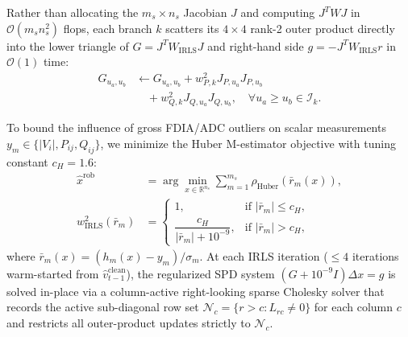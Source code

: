 \documentclass[journal,twoside]{IEEEtran}
\begin{document}
Rather than allocating the $m_s \times n_s$ Jacobian $J$ and computing $J^T W J$ in $\mathcal{O}(m_s n_s^2)$ flops, each branch $k$ scatters its $4 \times 4$ rank-2 outer product directly into the lower triangle of $G = J^T W_{\mathrm{IRLS}} J$ and right-hand side $g = -J^T W_{\mathrm{IRLS}} r$ in $\mathcal{O}(1)$ time:
\begin{equation}
\begin{aligned}
G_{u_a, u_b} &\gets G_{u_a, u_b} + w_{P,k}^2 J_{P,u_a} J_{P,u_b} \\
&\quad + w_{Q,k}^2 J_{Q,u_a} J_{Q,u_b}, \quad \forall u_a \ge u_b \in \mathcal{I}_k.
\end{aligned}
\label{eq:rank2_scatter}
\end{equation}

To bound the influence of gross FDIA/ADC outliers on scalar measurements $y_m \in \{|V_i|, P_{ij}, Q_{ij}\}$, we minimize the Huber M-estimator objective \cite{huber1981robust} with tuning constant $c_H = 1.6$:
\begin{equation}
\begin{aligned}
\hat{x}^{\mathrm{rob}} &= \arg\min_{x \in \mathbb{R}^{n_s}} \sum_{m=1}^{m_s} \rho_{\mathrm{Huber}}\left(\bar{r}_m(x)\right), \\
w_{\mathrm{IRLS}}^2(\bar{r}_m) &= \begin{cases}
1, & \text{if } |\bar{r}_m| \le c_H, \\
\dfrac{c_H}{|\bar{r}_m| + 10^{-9}}, & \text{if } |\bar{r}_m| > c_H,
\end{cases}
\end{aligned}
\label{eq:huber_irls}
\end{equation}
where $\bar{r}_m(x) = (h_m(x) - y_m)/\sigma_m$. At each IRLS iteration ($\le 4$ iterations warm-started from $\hat{v}_{t-1}^{\mathrm{clean}}$), the regularized SPD system $(G + 10^{-9}I)\Delta x = g$ is solved in-place via a column-active right-looking sparse Cholesky solver that records the active sub-diagonal row set $\mathcal{N}_c = \{r > c : L_{rc} \neq 0\}$ for each column $c$ and restricts all outer-product updates strictly to $\mathcal{N}_c$.
\end{document}
